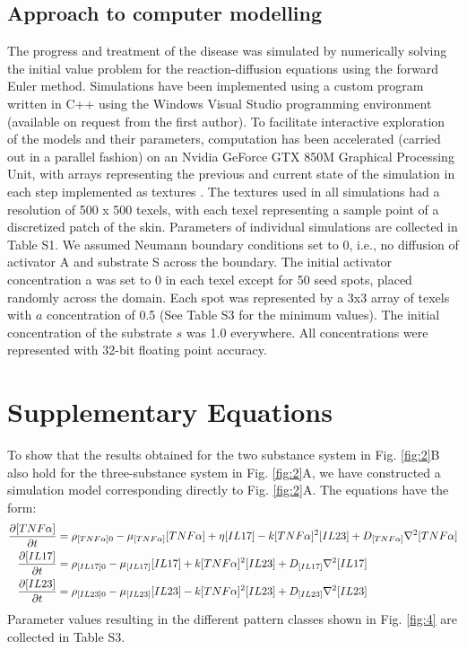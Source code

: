 \subsection{Approach to computer modelling}
The progress and treatment of the disease was simulated by numerically solving the initial value problem for the reaction-diffusion equations using the forward Euler method. Simulations have been implemented using a custom program written in C++ using the Windows Visual Studio programming environment (available on request from the first author). To facilitate interactive exploration of the models and their parameters, computation has been accelerated (carried out in a parallel fashion) on an Nvidia GeForce GTX 850M Graphical Processing Unit, with arrays representing the previous and current state of the simulation in each step implemented as textures \citep{dematte2010, harris2005}. The textures used in all simulations had a resolution of 500 x 500 texels, with each texel representing a sample point of a discretized patch of the skin. Parameters of individual simulations are collected in Table S1. We assumed Neumann boundary conditions set to 0, i.e., no diffusion of activator A and substrate S across the boundary. The initial activator concentration a was set to 0 in each texel except for 50 seed spots, placed randomly across the domain.  Each spot was represented by a 3x3 array of texels with $a$ concentration of 0.5 (See Table S3 for the minimum values). The initial concentration of the substrate $s$ was 1.0 everywhere.  All concentrations were represented with 32-bit floating point accuracy. 

\section{Supplementary Equations}
To show that the results obtained for the two substance system in Fig. \ref{fig:2}B also hold for the three-substance system in Fig. \ref{fig:2}A, we have constructed a simulation model corresponding directly to Fig. \ref{fig:2}A. The equations have the form: 
\begin{equation}
	\begin{aligned}
		\frac{\partial[TNF\alpha]}{\partial t}&=\rho_{[TNF\alpha]0}-\mu_{[TNF\alpha]}[TNF\alpha]+\eta[IL17]-k[TNF\alpha]^2[IL23]+D_{[TNF\alpha]}\nabla^2[TNF\alpha]\\
		\frac{\partial[IL17]}{\partial t}     &=\rho_{[IL17]0}     -\mu_{[IL17]}[IL17]                     +k[TNF\alpha]^2[IL23]+D_{[IL17]}\nabla^2[IL17]\\
		\frac{\partial[IL23]}{\partial t}     &=\rho_{[IL23]0}     -\mu_{[IL23]}[IL23]                     -k[TNF\alpha]^2[IL23]+D_{[IL23]}\nabla^2[IL23]
	\end{aligned}
\end{equation}
Parameter values resulting in the different pattern classes shown in Fig. \ref{fig:4} are collected in Table S3.

